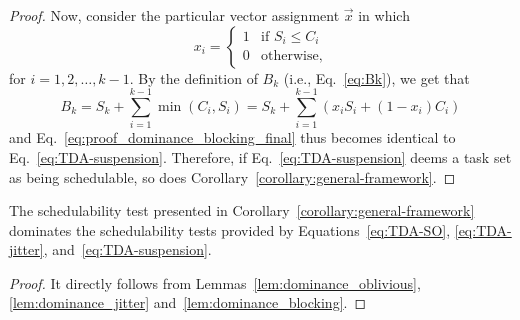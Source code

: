 \begin{proof}
    
    Now, consider the particular vector assignment $\vec{x}$ in which 
  \begin{equation*}
    x_i =
    \begin{cases}
      1 &\mbox{if } S_i \leq    C_i\\
      0 & \mbox{otherwise},
    \end{cases}
  \end{equation*}
  for $i=1,2,\ldots,k-1$. 
    By the definition of $B_k$ (i.e., Eq.~\eqref{eq:Bk}), we get that 
    $$B_k = S_k + \sum_{i=1}^{k-1} \min(C_i, S_i) = S_k + \sum_{i=1}^{k-1}(x_i
    S_i + (1-x_i) C_i)$$
and Eq.~\eqref{eq:proof_dominance_blocking_final} thus becomes identical to Eq.~\eqref{eq:TDA-suspension}. Therefore, if Eq.~\eqref{eq:TDA-suspension} deems a task set as being schedulable, so does Corollary~\ref{corollary:general-framework}. 
\end{proof}

\begin{theorem}
  \label{theorem:dominance}
  The schedulability test presented in Corollary~\ref{corollary:general-framework} dominates the schedulability tests provided by Equations~\eqref{eq:TDA-SO}, \eqref{eq:TDA-jitter}, and~\eqref{eq:TDA-suspension}.
\end{theorem}
\begin{proof}
It directly follows from Lemmas~\ref{lem:dominance_oblivious}, \ref{lem:dominance_jitter} and~\ref{lem:dominance_blocking}.
\end{proof}
